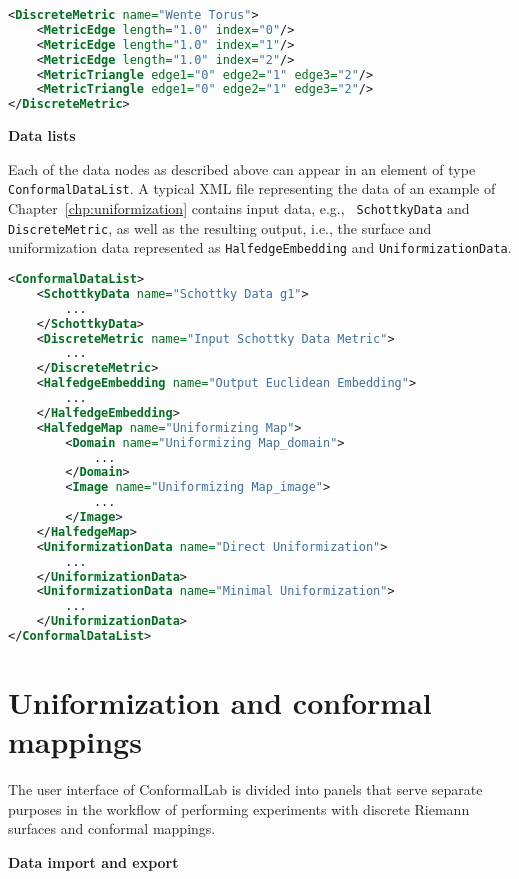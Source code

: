\documentclass[Thesis.tex]{subfiles}
\begin{document}
\begin{lstlisting}[label=lst:discretemetric_xml, caption={
A Wente torus given by a discrete metric. Vertices are given implicitly by following the order of triangle glueing.}, numbers=none, language=XML, captionpos=b]
<DiscreteMetric name="Wente Torus">
	<MetricEdge length="1.0" index="0"/>
	<MetricEdge length="1.0" index="1"/>
	<MetricEdge length="1.0" index="2"/>
	<MetricTriangle edge1="0" edge2="1" edge3="2"/>
	<MetricTriangle edge1="0" edge2="1" edge3="2"/>
</DiscreteMetric>
\end{lstlisting}

{\bf Data lists}

Each of the data nodes as described above can appear in an element of type {\tt
ConformalDataList}. A typical XML file representing the data of an example of
Chapter~\ref{chp:uniformization} contains input data, e.g., {\tt
SchottkyData} and {\tt DiscreteMetric}, as well as the resulting output, i.e.,
the surface and uniformization data represented as {\tt HalfedgeEmbedding} and
{\tt UniformizationData}.

\begin{lstlisting}[label=lst:datalist_xml, caption={A list of data XML nodes as the result of an algorithm calculating the Fuchsian uniformization of a genus $1$ Riemann surface given by Schottky data.}, numbers=none, language=XML, captionpos=b]
<ConformalDataList>
	<SchottkyData name="Schottky Data g1">
		...
	</SchottkyData>
	<DiscreteMetric name="Input Schottky Data Metric">
		...
	</DiscreteMetric>
	<HalfedgeEmbedding name="Output Euclidean Embedding">
		...
	</HalfedgeEmbedding>
	<HalfedgeMap name="Uniformizing Map">
		<Domain name="Uniformizing Map_domain">
			...
		</Domain>
		<Image name="Uniformizing Map_image">
			...
		</Image>
	</HalfedgeMap>
	<UniformizationData name="Direct Uniformization">
		...
	</UniformizationData>
	<UniformizationData name="Minimal Uniformization">
		...
	</UniformizationData>
</ConformalDataList>
\end{lstlisting}

\section{Uniformization and conformal mappings} \label{sec:conformallab_ui} The
user interface of {\sc ConformalLab} is divided into panels that serve
separate purposes in the workflow of performing experiments with discrete
Riemann surfaces and conformal mappings.


{\bf Data import and export}
\end{document}

